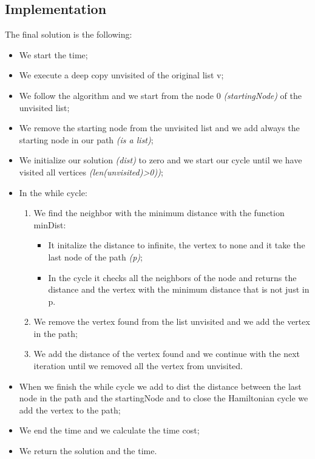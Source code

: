 \subsection{Implementation}
The final solution is the following:
\begin{itemize}
	\item We start the time;
	\item We execute a deep copy unvisited of the original list v;
	\item We follow the algorithm and we start from the node 0 \textit{(startingNode)} of the unvisited list;
	\item We remove the starting node from the unvisited list and we add always the starting node in our path \textit{(is a list)};
	\item We initialize our solution \textit{(dist)} to zero and we start our cycle until we have visited all vertices \textit{(len(unvisited)>0))};
	\item In the while cycle:
		\begin{enumerate}
			\item  We find the neighbor with the minimum distance with the function minDist:
				\begin{itemize}
				\item  It initalize the distance to infinite, the vertex to none and it take the last node of the path \textit{(p)};
				\item  In the cycle it checks all the neighbors of the node and returns the distance and the vertex with the minimum distance that is not just in p.
				\end{itemize}
			\item We remove the vertex found from the list unvisited and we add the vertex in the path;
			\item We add the distance of the vertex found and we continue with the next iteration until we removed all the vertex from unvisited. 
		\end{enumerate}
	\item When we finish the while cycle we add to dist the distance between the last node in the path and the startingNode and to close the Hamiltonian cycle we add the vertex to the path;
	\item We end the time and we calculate the time cost;
	\item We return the solution and the time.
\end{itemize}

\pagebreak